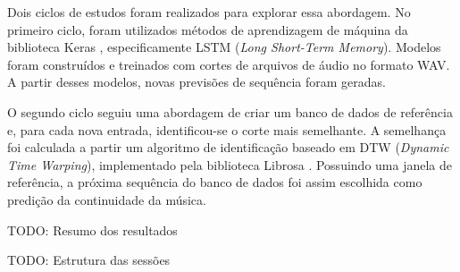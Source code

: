 Dois ciclos de estudos foram realizados para explorar essa abordagem. No primeiro ciclo, foram utilizados métodos de aprendizagem de máquina da biblioteca Keras \cite{keras}, especificamente LSTM (\textit{Long Short-Term Memory})\cite{lstm}. Modelos foram construídos e treinados com cortes de arquivos de áudio no formato WAV. A partir desses modelos, novas previsões de sequência foram geradas.

O segundo ciclo seguiu uma abordagem de criar um banco de dados de referência e, para cada nova entrada, identificou-se o corte mais semelhante. A semelhança foi calculada a partir um algoritmo de identificação baseado em DTW (\textit{Dynamic Time Warping})\cite{dtw}, implementado pela biblioteca Librosa \cite{librosa}. Possuindo uma janela de referência, a próxima sequência do banco de dados foi assim escolhida como predição da continuidade da música.

TODO: Resumo dos resultados

TODO: Estrutura das sessões